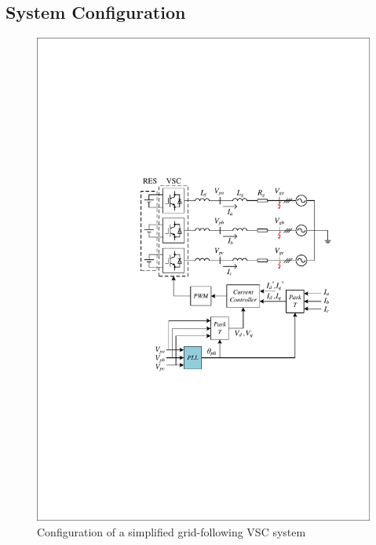 \documentclass[10pt,final,journal,twoside]{IEEEtran}
\begin{document}
\subsection{System Configuration}\label{subsec:config}
\begin{figure}[!t]
\centering
\includegraphics[width=1.0\linewidth]{../Diagrams/grid-connected_VSC.pdf}
\caption{Configuration of a simplified grid-following VSC system}
\label{fig_vsc}
\end{figure}
\end{document}

